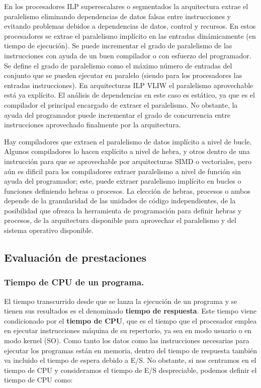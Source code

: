 \documentclass[a4paper, 11pt]{article}
\begin{document}
En los procesadores ILP superescalares o segmentados la arquitectura extrae el paralelismo eliminando dependencias de datos falsas entre instrucciones y evitando problemas debidos a dependencias de datos, control y recursos. En estos procesadores se extrae el paralelismo implícito en las entradas dinámicamente (en tiempo de ejecución). Se puede incrementar el grado de paralelismo de las instrucciones con ayuda de un buen compilador o con esfuerzo del programador. Se define el grado de paralelismo como el máximo número de entradas del conjunto que se pueden ejecutar en paralelo (siendo para los procesadores las entradas instrucciones). En arquitecturas ILP VLIW el paralelismo aprovechable está ya explícito. El análisis de dependencias en este caso es estático, ya que es el compilador el principal encargado de extraer el paralelismo. No obstante, la ayuda del programador puede incrementar el grado de concurrencia entre instrucciones aprovechado finalmente por la arquitectura.

Hay compiladores que extraen el paralelismo de datos implícito a nivel de bucle. Algunos compiladores lo hacen explícito a nivel de hebra, y otros dentro de una instrucción para que se aprovechable por arquitecturas SIMD o vectoriales, pero aún es dificil para los compiladores extraer paralelismo a nivel de función sin ayuda del programador; este, puede extraer paralelismo implícito en bucles o funciones definiendo hebras o procesos. La elección de hebras, procesos o ambos depende de la granularidad de las unidades de código independientes, de la posibilidad que ofrezca la herramienta de programación para definir hebras y procesos, de la arquitectura disponible para aprovechar el paralelismo y del sistema operativo disponible. 	

 
\subsection{Evaluación de prestaciones}
\subsubsection{Tiempo de CPU de un programa.}
El tiempo transcurrido desde que se lanza la ejecución de un programa y se tienen sus resultados es el denominado \textbf{tiempo de respuesta}. Este tiempo viene condicionado por el \textbf{tiempo de CPU}, que es el tiempo que el procesador emplea en ejecutar instrucciones máquina de su repertorio, ya sea en modo usuario o en modo kernel (SO). Como tanto los datos como las instrucciones necesarias para ejecutar los programas están en memoria, dentro del tiempo de respuesta también va incluido el tiempo de espera debido a E/S. No obstante, si nos centramos en el tiempo de CPU y consideramos el tiempo de E/S despreciable, podemos definir el tiempo de CPU como:
\end{document}
